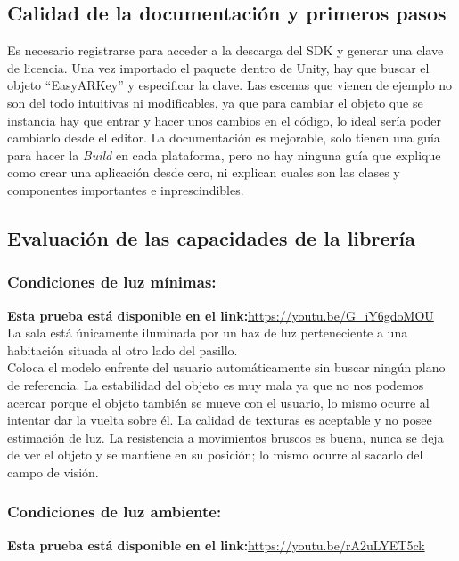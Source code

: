 \subsection{Calidad de la documentación y primeros pasos}
Es necesario registrarse para acceder a la descarga del SDK y generar una clave de licencia. Una vez importado el paquete dentro de Unity, hay que buscar el objeto ``EasyARKey'' y especificar la clave. Las escenas que vienen de ejemplo no son del todo intuitivas ni modificables, ya que para cambiar el objeto que se instancia hay que entrar y hacer unos cambios en el código, lo ideal sería poder cambiarlo desde el editor. La documentación es mejorable, solo tienen una guía para hacer la \textit{Build} en cada plataforma, pero no hay ninguna guía que explique como crear una aplicación desde cero, ni explican cuales son las clases y componentes importantes e inprescindibles.

\subsection{Evaluación de las capacidades de la librería}
\subsubsection{Condiciones de luz mínimas:}
\textbf{Esta prueba está disponible en el link:}\url{https://youtu.be/G_iY6gdoMOU}\\

La sala está únicamente iluminada por un haz de luz perteneciente a una habitación situada al otro lado del pasillo.\\

Coloca el modelo enfrente del usuario automáticamente sin buscar ningún plano de referencia. La estabilidad del objeto es muy mala ya que no nos podemos acercar porque el objeto también se mueve con el usuario, lo mismo ocurre al intentar dar la vuelta sobre él. La calidad de texturas es aceptable y no posee estimación de luz. La resistencia a movimientos bruscos es buena, nunca se deja de ver el objeto y se mantiene en su posición; lo mismo ocurre al sacarlo del campo de visión.

\subsubsection{Condiciones de luz ambiente:}
\textbf{Esta prueba está disponible en el link:}\url{https://youtu.be/rA2uLYET5ck}\\

